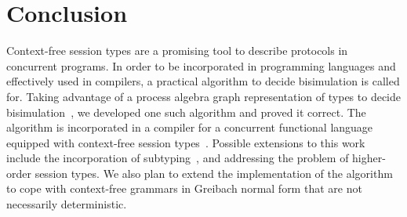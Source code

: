\section{Conclusion}
\label{sec:conclusion}

Context-free session types are a promising tool to describe protocols
in concurrent programs. In order to be incorporated in programming
languages and effectively used in compilers, a practical algorithm to
decide bisimulation is called for.
%
Taking advantage of a process algebra graph representation of types to
decide
bisimulation~\cite{DBLP:journals/tcs/HirshfeldJM96,DBLP:conf/concur/HirshfeldM94},
we developed one such algorithm and proved it correct. The algorithm
is incorporated in a compiler for a concurrent functional language
equipped with context-free session
types~\cite{almeida.etal_freest-functional-language}.
%
Possible extensions to this work include the incorporation of
subtyping~\cite{DBLP:journals/acta/GayH05}, and addressing the problem
of higher-order session types. 
We also plan to extend the implementation of the algorithm to cope
with context-free grammars in Greibach normal form that are not 
necessarily deterministic.



